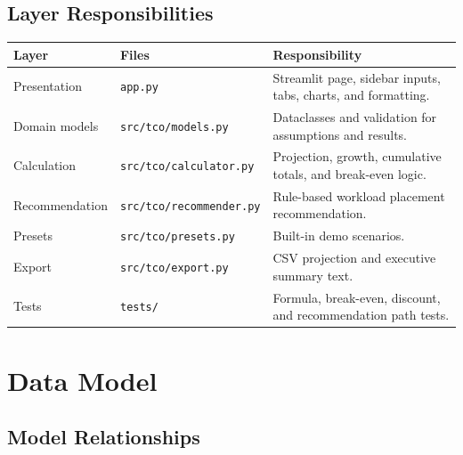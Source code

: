 \documentclass[11pt,a4paper]{article}
\begin{document}
\subsection{Layer Responsibilities}

\begin{longtable}{p{}p{}p{}}
\toprule
\textbf{Layer} & \textbf{Files} & \textbf{Responsibility} \\
\midrule
Presentation & \texttt{app.py} & Streamlit page, sidebar inputs, tabs, charts, and formatting. \\
Domain models & \texttt{src/tco/models.py} & Dataclasses and validation for assumptions and results. \\
Calculation & \texttt{src/tco/calculator.py} & Projection, growth, cumulative totals, and break-even logic. \\
Recommendation & \texttt{src/tco/recommender.py} & Rule-based workload placement recommendation. \\
Presets & \texttt{src/tco/presets.py} & Built-in demo scenarios. \\
Export & \texttt{src/tco/export.py} & CSV projection and executive summary text. \\
Tests & \texttt{tests/} & Formula, break-even, discount, and recommendation path tests. \\
\bottomrule
\end{longtable}

\section{Data Model}

\subsection{Model Relationships}

\begin{center}
\end{center}
\end{document}
